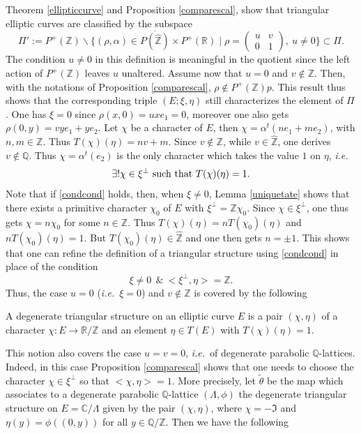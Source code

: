\documentclass[graybox, envcountsect%
]{svmult}
\def\C{{\mathbb C}}
\def\Q{{\mathbb Q}}
\def\R{{\mathbb R}}
\def\Z{{\mathbb Z}}
\newcommand{\ie}{{\it i.e.\/}\ }
\begin{document}
Theorem \ref{ellipticcurve}  and Proposition \ref{comparescal}, show that triangular elliptic curves  are classified by the subspace
$$
\Pi':=P^+(\Z)\backslash\{(\rho,\alpha)\in \overline{P(\hat \Z)}\times P^+(\R)\mid \rho =\begin{pmatrix} u &v \\ 0 &1 \end{pmatrix}, \ u\neq 0\}\subset \Pi.
$$  
The condition $u\neq 0$ in this definition is meaningful  in the quotient since the left action of $P^+(\Z)$ leaves $u$ unaltered. Assume now that $u=0$ and $v\notin \Z$. Then, with the notations of Proposition \ref{comparescal}, $\rho\notin P^+(\Z)p$. This result thus shows that the corresponding triple $(E;\xi,\eta)$ still characterizes the element of $\Pi$. One has $\xi=0$ since $\rho(x,0)=u xe_1=0$, moreover one also gets  $\rho(0,y)=v ye_1+y e_2$. Let $\chi$ be a character of $E$, then $\chi=\alpha^t(ne_1+me_2)$,  with $n,m\in \Z$. Thus $T(\chi)(\eta)=nv+m$. Since $v\notin \Z$, while $v\in \hat \Z$, one derives  $v\notin \Q$. Thus $\chi=\alpha^t(e_2)$  is the only character which takes the value $1$ on $\eta$, \ie 
\begin{equation}\label{condcond}
\exists ! \chi\in \xi^\perp ~{\rm such~ that} ~T(\chi)(\eta)=1. 
\end{equation} 
Note that if  \eqref{condcond} holds, then, when $\xi\neq 0$,  Lemma \ref{uniquetate} shows  that there exists a primitive character $\chi_0$ of $E$ with $\xi^\perp=\Z\chi_0$. Since $\chi\in \xi^\perp$, one thus gets $\chi=n \chi_0$ for some $n\in \Z$. Thus  $T(\chi)(\eta)=n T(\chi_0)(\eta)$ and $n T(\chi_0)(\eta)=1$. But $T(\chi_0)(\eta)\in \hat \Z$ and one then gets $n=\pm 1$. This shows that one can refine the definition of a triangular structure using \eqref{condcond} in place of the condition
$$
\xi \neq 0\ \ \& \ <\xi^\perp,\eta>=\Z.
$$
  Thus, the case $u=0$ (\ie $\xi=0$) and $v\notin \Z$ is covered by the following
  
\begin{definition}\label{degeneratetr} A degenerate triangular structure on an elliptic curve $E$ is a pair $(\chi,\eta)$ of a character 	$\chi:E\to \R/\Z$ and an element  $\eta \in T(E)$ with  $T(\chi)(\eta)=1$.
\end{definition}
This notion also covers  the case  $u=v=0$, \ie of degenerate parabolic $\Q$-lattices.  Indeed, in this case Proposition \ref{comparescal} shows  that one needs to choose the character $\chi\in \xi^\perp$ so that $<\chi,\eta>=1$.
More precisely, let $\tilde \theta$ be the  map which associates to a degenerate parabolic $\Q$-lattice $(\Lambda,\phi)$  the degenerate triangular structure on $E=\C/\Lambda$ given by the pair $(\chi,\eta)$, where $\chi=-\Im$ and $\eta(y)=\phi((0,y))$ for all $y\in \Q/\Z$. Then we have the following
\end{document}
